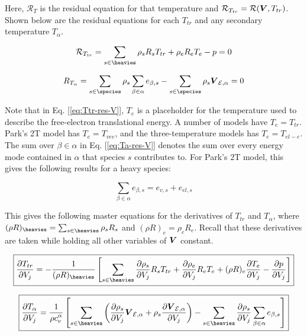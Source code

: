 \documentclass[10pt]{article}
\begin{document}
\begin{flushleft}
Here, $\mathcal{R}_T$ is the residual equation for that temperature and $\mathcal{R}_{T_{tr}} = \mathcal{R}(\boldsymbol{V}, T_{tr})$. Shown below are the residual equations for each $T_{tr}$ and any secondary temperature $T_\alpha$. 

\begin{equation}
    \mathcal{R}_{T_{tr}} = \sum_{s \in \heavies} \rho_s R_s T_{tr} + \rho_e R_e T_e - p = 0
    \label{eq:Ttr-res-V}
\end{equation}

\begin{equation}
    R_{T_\alpha} = \sum_{s \in \species} \rho_s \sum_{\beta \in \alpha} e_{\beta,s} - \sum_{s \in \species} \rho_s \bigV_{\mathcal{E},\alpha} = 0
    \label{eq:Ta-res-V}
\end{equation}

Note that in Eq. [\ref{eq:Ttr-res-V}], $T_e$ is a placeholder for the temperature used to describe the free-electron translational energy. A number of models have $T_e = T_{tr}$. Park's 2T model has $T_e = T_{vee}$, and the three-temperature models has $T_e = T_{el-e}$. The sum over $\beta \in \alpha$ in Eq. [\ref{eq:Ta-res-V}] denotes the sum over every energy mode contained in $\alpha$ that species $s$ contributes to. For Park's 2T model, this gives the following results for a heavy species:

\begin{equation}
    \sum_{\beta \in \alpha} e_{\beta,s} = e_{v,s} + e_{el,s}
\end{equation}

This gives the following master equations for the derivatives of $T_{tr}$ and $T_\alpha$, where $(\rho R)_{\heavies} = \sum_{s \in \heavies} \rho_s R_s$ and $(\rho R)_e = \rho_e R_e$. Recall that these derivatives are taken while holding all other variables of $\boldsymbol{V}$ constant.

\begin{equation}
    \boxed{\pd{T_{tr}}{V_j} = - \frac{1}{(\rho R)_{\heavies}} \bb{ \sum_{s \in \heavies} \pd{\rho_s}{V_j} R_s T_{tr} + \pd{\rho_e}{V_j} R_e T_e + (\rho R)_e \pd{T_e}{V_j} - \pd{p}{V_j}}}
    \label{eq:Ttr-V-master}
\end{equation}

\begin{equation}
    \boxed{\pd{T_\alpha}{V_j} = \frac{1}{\displaystyle \rho c_v^\alpha} \bb{\sum_{s \in \heavies} \bp{\pd{\rho_s}{V_j} \bigV_{\mathcal{E}, \alpha} + \rho_s \pd{\bigV_{\mathcal{E}, \alpha}}{V_j}} - \sum_{s \in \heavies} \pd{\rho_s}{V_j} \sum_{\beta \in \alpha} e_{\beta,s}}}
    \label{eq:Ta-V-master}
\end{equation}


\end{flushleft}
\end{document}
